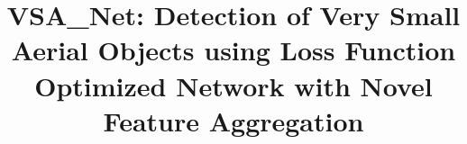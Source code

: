 \documentclass[preprint,review,12pt]{elsarticle}
\begin{document}
\begin{frontmatter}



\title{VSA\_Net: Detection of Very Small Aerial Objects using Loss Function Optimized Network with Novel Feature Aggregation}










\end{frontmatter}
\end{document}
